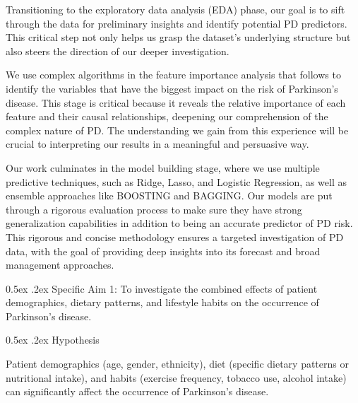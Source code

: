 \documentclass[12pt,]{article}
\makeatletter
\renewcommand\subsection{
  \@startsection{subsection}{2}{\z@}
    {-1.5ex\@plus -1ex \@minus -.2ex}%
    {0.5ex \@plus .2ex}%
    {\normalfont\normalsize\bf}} %
\renewcommand\subsubsection{
  \@startsection{subsubsection}{3}{\z@}
    {-1.0ex\@plus -1ex \@minus -.2ex}%
    {0.5ex \@plus .2ex}%
    {\normalfont\normalsize\bf}} %
\makeatother
\begin{document}
Transitioning to the exploratory data analysis (EDA) phase, our goal is
to sift through the data for preliminary insights and identify potential
PD predictors. This critical step not only helps us grasp the dataset's
underlying structure but also steers the direction of our deeper
investigation.

We use complex algorithms in the feature importance analysis that
follows to identify the variables that have the biggest impact on the
risk of Parkinson's disease. This stage is critical because it reveals
the relative importance of each feature and their causal relationships,
deepening our comprehension of the complex nature of PD. The
understanding we gain from this experience will be crucial to
interpreting our results in a meaningful and persuasive way.

Our work culminates in the model building stage, where we use multiple
predictive techniques, such as Ridge, Lasso, and Logistic Regression, as
well as ensemble approaches like BOOSTING and BAGGING. Our models are
put through a rigorous evaluation process to make sure they have strong
generalization capabilities in addition to being an accurate predictor
of PD risk. This rigorous and concise methodology ensures a targeted
investigation of PD data, with the goal of providing deep insights into
its forecast and broad management approaches.

\hypertarget{specific-aim-1-to-investigate-the-combined-effects-of-patient-demographics-dietary-patterns-and-lifestyle-habits-on-the-occurrence-of-parkinsons-disease.}{%
\subsection{Specific Aim 1: To investigate the combined effects of
patient demographics, dietary patterns, and lifestyle habits on the
occurrence of Parkinson's
disease.}\label{specific-aim-1-to-investigate-the-combined-effects-of-patient-demographics-dietary-patterns-and-lifestyle-habits-on-the-occurrence-of-parkinsons-disease.}}

\hypertarget{hypothesis}{%
\subsubsection{Hypothesis}\label{hypothesis}}

Patient demographics (age, gender, ethnicity), diet (specific dietary
patterns or nutritional intake), and habits (exercise frequency, tobacco
use, alcohol intake) can significantly affect the occurrence of
Parkinson's disease.
\end{document}
